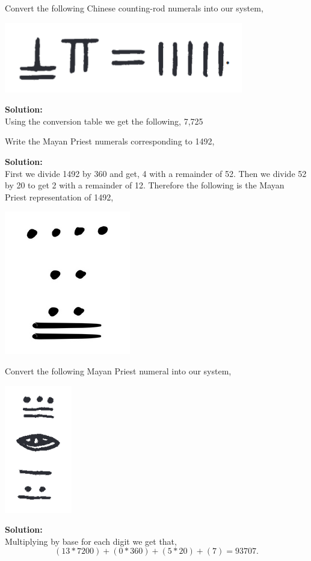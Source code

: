 \documentclass[12pt]{article}
\makeatletter
\theoremstyle{homework}
\newenvironment{exercise}[1]
{\def\@currentlabel{#1}\exercisecore}
{\endexercisecore}
\newcommand{\localhead}[1]{\par\smallskip\noindent\textbf{#1}\nobreak\\}%
\newcommand\solution{\localhead{Solution:}}
\makeatother
\begin{document}
\begin{exercise}{7} Convert the following Chinese counting-rod numerals into our system,
    \begin{center}
        \includegraphics[width = .33\textwidth]{chin2.png}        
    \end{center}
    
    \solution Using the conversion table we get the following, 7,725
    
\end{exercise}



\begin{exercise}{13} Write the Mayan Priest numerals corresponding to 1492,
    \solution First we divide 1492 by 360 and get, 4 with a remainder of 52. 
    Then we divide 52 by 20 to get 2 with a remainder of 12. Therefore the following is the 
    Mayan Priest representation of 1492,
    \begin{center}
        \includegraphics[width = .15\textwidth]{Maya.png}        
    \end{center}
    
\end{exercise}

\begin{exercise}{14} Convert the following Mayan Priest numeral into our system, 
    \begin{center}
        \includegraphics[width = .15\textwidth]{Maya2.png}        
    \end{center}
    \solution Multiplying by base for each digit we get that,
    \begin{equation*}
        (13*7200)+(0*360)+(5*20)+(7) = 93707.
    \end{equation*}
\end{exercise}
\end{document}
